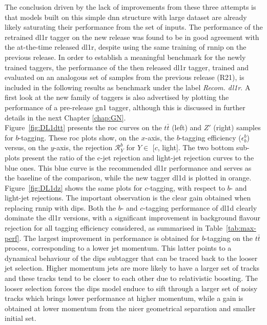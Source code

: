 The conclusion driven by the lack of improvements from these three attempts is that models built on this simple \gls{dnn} structure with large dataset are already likely saturating their performance from the set of inputs. The performance of the retrained \gls{dl1r} tagger on the new release was found to be in good agreement with the at-the-time released \gls{dl1r}, despite using the same training of \gls{rnnip} on the previous release. In order to establish a meaningful benchmark for the newly trained taggers, the performance of the then released \gls{dl1r} tagger, trained and evaluated on an analogous set of samples from the previous release (R21), is included in the following results as benchmark under the label \textit{Recom. \gls{dl1r}}. A first look at the new family of taggers is also advertised by plotting the performance of a pre-release \gls{gn1} tagger, although this is discussed in further details in the next Chapter \ref{chap:GN}. \\

Figure~\ref{fig:DL1dtt} presents the \gls{roc} curves on the $t\bar{t}$ (left) and $Z'$ (right) samples for $b$-tagging. These \gls{roc} plots show, on the $x$-axis, the $b$-tagging efficiency ($\epsilon^b_b$) versus, on the $y$-axis, the rejection $\mathcal{R}^b_Y$ for $Y \in$ [$c$, light]. The two bottom sub-plots present the ratio of the c-jet rejection and light-jet rejection curves to the blue ones. This blue curve is the recommended \gls{dl1r} performance and serves as the baseline of the comparison, while the new tagger \gls{dl1d} is plotted in orange. Figure~\ref{fig:DL1dz} shows the same plots for $c$-tagging, with respect to $b$- and light-jet rejections. The important observation is the clear gain obtained when replacing \gls{rnnip} with \gls{dips}. Both the $b$- and $c$-tagging performance of \gls{dl1d} clearly dominate the \gls{dl1r} versions, with a significant improvement in background flavour rejection for all tagging efficiency considered, as summarised in Table~\ref{tab:max-perf}. The largest improvement in performance is obtained for $b$-tagging on the $t\bar{t}$ process, corresponding to a lower jet momentum. This latter points to a dynamical behaviour of the \gls{dips} subtagger that can be traced back to the looser jet selection. Higher momentum jets are more likely to have a larger set of tracks and these tracks tend to be closer to each other due to relativistic boosting. The looser selection forces the \gls{dips} model enduce to sift through a larger set of noisy tracks which brings lower performance at higher momentum, while a gain is obtained at lower momentum from the nicer geometrical separation and smaller initial set.  \\

